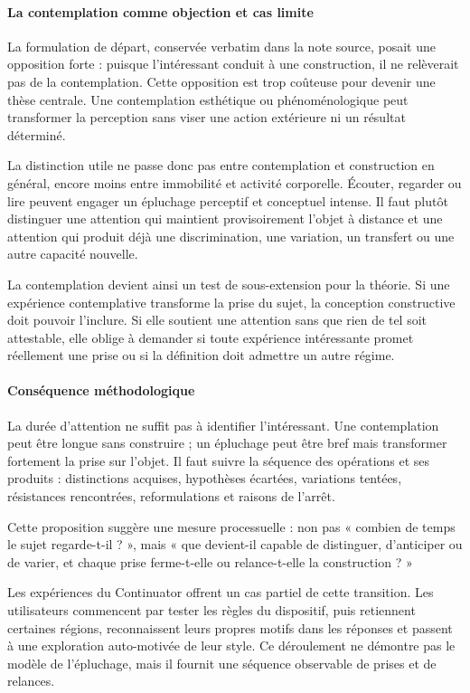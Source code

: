 \documentclass[10pt,a4paper]{article}
\begin{document}
\paragraph{La contemplation comme objection et cas limite}
La formulation de départ, conservée verbatim dans la note source, posait une opposition forte : puisque l'intéressant conduit à une construction, il ne relèverait pas de la contemplation. Cette opposition est trop coûteuse pour devenir une thèse centrale. Une contemplation esthétique ou phénoménologique peut transformer la perception sans viser une action extérieure ni un résultat déterminé.

La distinction utile ne passe donc pas entre contemplation et construction en général, encore moins entre immobilité et activité corporelle. Écouter, regarder ou lire peuvent engager un épluchage perceptif et conceptuel intense. Il faut plutôt distinguer une attention qui maintient provisoirement l'objet à distance et une attention qui produit déjà une discrimination, une variation, un transfert ou une autre capacité nouvelle.

La contemplation devient ainsi un test de sous-extension pour la théorie. Si une expérience contemplative transforme la prise du sujet, la conception constructive doit pouvoir l'inclure. Si elle soutient une attention sans que rien de tel soit attestable, elle oblige à demander si toute expérience intéressante promet réellement une prise ou si la définition doit admettre un autre régime.

\paragraph{Conséquence méthodologique}
La durée d'attention ne suffit pas à identifier l'intéressant. Une contemplation peut être longue sans construire ; un épluchage peut être bref mais transformer fortement la prise sur l'objet. Il faut suivre la séquence des opérations et ses produits : distinctions acquises, hypothèses écartées, variations tentées, résistances rencontrées, reformulations et raisons de l'arrêt.

Cette proposition suggère une mesure processuelle : non pas « combien de temps le sujet regarde-t-il ? », mais « que devient-il capable de distinguer, d'anticiper ou de varier, et chaque prise ferme-t-elle ou relance-t-elle la construction ? »

Les expériences du Continuator offrent un cas partiel de cette transition. Les utilisateurs commencent par tester les règles du dispositif, puis retiennent certaines régions, reconnaissent leurs propres motifs dans les réponses et passent à une exploration auto-motivée de leur style. Ce déroulement ne démontre pas le modèle de l'épluchage, mais il fournit une séquence observable de prises et de relances.
\end{document}
